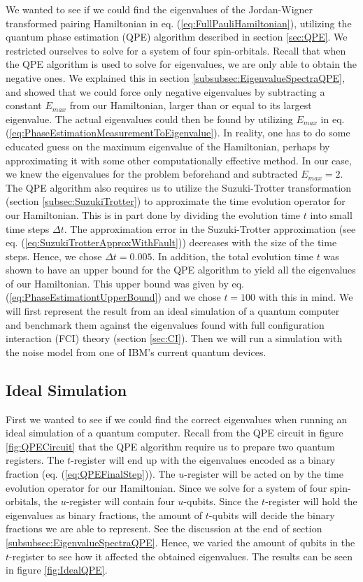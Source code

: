 We wanted to see if we could find the eigenvalues of the Jordan-Wigner transformed pairing Hamiltonian in eq. (\ref{eq:FullPauliHamiltonian}), utilizing the quantum phase estimation (QPE) algorithm described in section \ref{sec:QPE}. We restricted ourselves to solve for a system of four spin-orbitals. Recall that when the QPE algorithm is used to solve for eigenvalues, we are only able to obtain the negative ones. We explained this in section \ref{subsubsec:EigenvalueSpectraQPE}, and showed that we could force only negative eigenvalues by subtracting a constant $E_{max}$ from our Hamiltonian, larger than or equal to its largest eigenvalue. The actual eigenvalues could then be found by utilizing $E_{max}$ in eq. (\ref{eq:PhaseEstimationMeasurementToEigenvalue}). In reality, one has to do some educated guess on the maximum eigenvalue of the Hamiltonian, perhaps by approximating it with some other computationally effective method. In our case, we knew the eigenvalues for the problem beforehand and subtracted $E_{max} = 2$. The QPE algorithm also requires us to utilize the Suzuki-Trotter transformation (section \ref{subsec:SuzukiTrotter}) to approximate the time evolution operator for our Hamiltonian. This is in part done by dividing the evolution time $t$ into small time steps $\Delta t$. The approximation error in the Suzuki-Trotter approximation (see eq. (\ref{eq:SuzukiTrotterApproxWithFault})) decreases with the size of the time steps. Hence, we chose $\Delta t = 0.005$. In addition, the total evolution time $t$ was shown to have an upper bound for the QPE algorithm to yield all the eigenvalues of our Hamiltonian. This upper bound was given by eq. (\ref{eq:PhaseEstimationtUpperBound}) and we chose $t=100$ with this in mind.\newline
We will first represent the result from an ideal simulation of a quantum computer and benchmark them against the eigenvalues found with full configuration interaction (FCI) theory (section \ref{sec:CI}). Then we will run a simulation with the noise model from one of IBM's current quantum devices.

\subsection{Ideal Simulation}
\label{subsec:ResQPEIdeal}
First we wanted to see if we could find the correct eigenvalues when running an ideal simulation of a quantum computer. Recall from the QPE circuit in figure \ref{fig:QPECircuit} that the QPE algorithm require us to prepare two quantum registers. The $t$-register will end up with the eigenvalues encoded as a binary fraction (eq. (\ref{eq:QPEFinalStep})). The $u$-register will be acted on by the time evolution operator for our Hamiltonian. Since we solve for a system of four spin-orbitals, the $u$-register will contain four $u$-qubits. Since the $t$-register will hold the eigenvalues as binary fractions, the amount of $t$-qubits will decide the binary fractions we are able to represent. See the discussion at the end of section \ref{subsubsec:EigenvalueSpectraQPE}. Hence, we varied the amount of qubits in the $t$-register to see how it affected the obtained eigenvalues. The results can be seen in figure \ref{fig:IdealQPE}.

